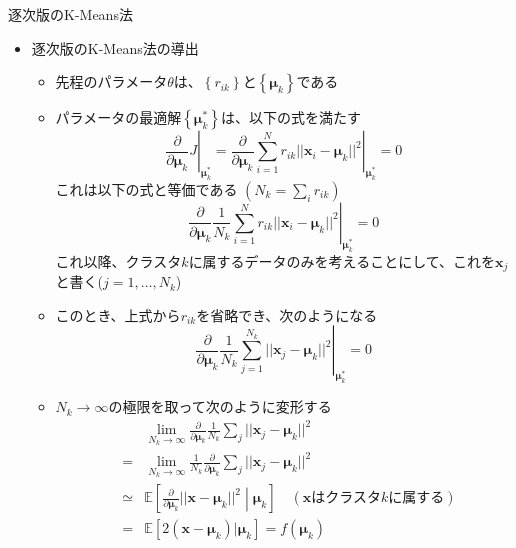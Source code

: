 \documentclass[dvipdfmx,notheorems,t]{beamer}
\begin{document}
\begin{frame}{逐次版のK-Means法}

\begin{itemize}
	\item 逐次版のK-Means法の導出
	\begin{itemize}
		\item 先程のパラメータ$\theta$は、$\left\{ r_{ik} \right\}$と$\left\{ \bm{\mu}_k \right\}$である
		
		\item パラメータの最適解$\left\{ \bm{\mu}_k^* \right\}$は、以下の式を満たす
		\begin{equation}
			\left. \frac{\partial}{\partial \bm{\mu}_k} J \right|_{\bm{\mu}_k^*} = \left. \frac{\partial}{\partial \bm{\mu}_k} \sum_{i = 1}^N r_{ik} || \bm{x}_i - \bm{\mu}_k ||^2 \right|_{\bm{\mu}_k^*} = 0
		\end{equation}
		これは以下の式と等価である $(N_k = \sum_i r_{ik})$
		\begin{equation}
			\left. \frac{\partial}{\partial \bm{\mu}_k} \frac{1}{N_k} \sum_{i = 1}^N r_{ik} || \bm{x}_i - \bm{\mu}_k ||^2 \right|_{\bm{\mu}_k^*} = 0
		\end{equation}
		これ以降、クラスタ$k$に属するデータのみを考えることにして、これを$\bm{x}_j$と書く($j = 1, \ldots, N_k$)
		
		\item このとき、上式から$r_{ik}$を省略でき、次のようになる
		\begin{equation}
			\left. \frac{\partial}{\partial \bm{\mu}_k} \frac{1}{N_k} \sum_{j = 1}^{N_k} || \bm{x}_j - \bm{\mu}_k ||^2 \right|_{\bm{\mu}_k^*} = 0
		\end{equation}
		
		\item $N_k \to \infty$の極限を取って次のように変形する
		\begin{eqnarray}
			&& \lim_{N_k \to \infty} \frac{\partial}{\partial \bm{\mu}_k} \frac{1}{N_k} \sum_j || \bm{x}_j - \bm{\mu}_k ||^2 \nonumber \\
			&=& \lim_{N_k \to \infty} \frac{1}{N_k} \frac{\partial}{\partial \bm{\mu}_k} \sum_j || \bm{x}_j - \bm{\mu}_k ||^2 \nonumber \\
			&\simeq& \mathbb{E} \left[ \frac{\partial}{\partial \bm{\mu}_k} || \bm{x} - \bm{\mu}_k ||^2 \middle| \bm{\mu}_k \right] \quad (\bm{x}\text{はクラスタ$k$に属する}) \nonumber \\
			&=& \mathbb{E} \left[ 2 (\bm{x} - \bm{\mu}_k) | \bm{\mu}_k \right] = f(\bm{\mu}_k)
		\end{eqnarray}
		

\end{itemize}
\end{itemize}
\end{frame}
\end{document}
